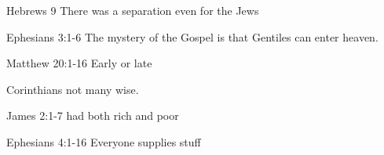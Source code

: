 \begin{discussion}

Hebrews 9 There was a separation even for the Jews

Ephesians 3:1-6 The mystery of the Gospel is that Gentiles can enter heaven.


Matthew 20:1-16 Early or late

Corinthians not many wise.


James 2:1-7 had both rich and poor

Ephesians 4:1-16 Everyone supplies stuff

\end{discussion}